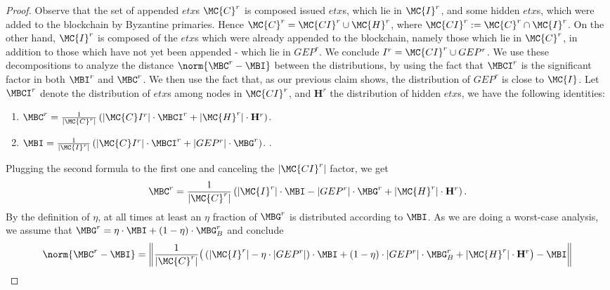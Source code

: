 \begin{proof}

Observe that the set of appended $etx$s $\MC{C}^r$ is composed issued $etx$s, which lie in $\MC{I}^r$, and some hidden $etx$s, which were added to the blockchain by Byzantine primaries.
Hence $\MC{C}^r=\MC{CI}^r\cup \MC{H}^r$, where $\MC{CI}^r:=\MC{C}^r\cap \MC{I}^r$. On the other hand, $\MC{I}^r$ is composed of the $etx$s which were already appended to the blockchain, namely those which lie in $\MC{C}^r$, in addition to those which have not yet been appended - which lie in $GEP^r$. We conclude $I^r=\MC{CI}^r\cup GEP^r$. We use these decompositions to analyze the distance $\norm{\MBC^r-\MBI}$ between the distributions, by using the fact that $\MBCI^r$ is the significant factor in both $\MBI^r$ and $\MBC^r$. We then use the fact that, as our previous claim shows, the distribution of $GEP^r$ is close to $\MC{I}$. Let $\MBCI^r$ denote the distribution of $etx$s among nodes in $\MC{CI}^r$, and $\mathbf{H}^r$ the distribution of hidden $etx$s, we have the following identities:
\begin{enumerate}
	\item  $\MBC^r=\frac{1}{|\MC{C}^r|}\left(|\MC{C}I^r|\cdot \MBCI^r+|\MC{H}^r|\cdot \mathbf{H}^r\right)$.
	\item $\MBI=\frac{1}{|\MC{I}^r|}\left(|\MC{C}I^r|\cdot\MBCI^r +|GEP^r|\cdot\MBG^r\right)$. %
	.
\end{enumerate}
Plugging the second formula to the first one and canceling the $|\MC{CI}^r|$  factor, we get 
$$\MBC^r=\frac{1}{|\MC{C}^r|}\left(|\MC{I}^r|\cdot\MBI-|GEP^r|\cdot \MBG^r+|\MC{H}^r|\cdot \mathbf{H}^r\right).$$
By the definition of $\eta$, at all times at least an $\eta$ fraction of $\MBG^r$ is distributed according to $\MBI$. As we are doing a worst-case analysis, we assume that  $\MBG^r=\eta \cdot\MBI+(1-\eta)\cdot \MBG_B^r$  and conclude
 \begin{equation}\begin{split}
 \norm{\MBC^r-\MBI} & =  \left \lVert \frac{1}{|\MC{C}^r|}\big(\left(|\MC{I}^r|-\eta\cdot |GEP^r|\right)\cdot \MBI+ (1-\eta)\cdot|GEP^r|\cdot \MBG^r_B+|\MC{H}^r|\cdot \mathbf{H}^r\big)-\MBI \right \rVert \\

\end{split}
\end{equation}
\end{proof}
